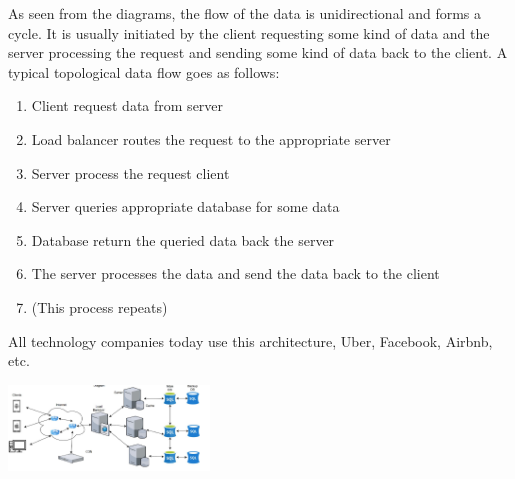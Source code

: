 As seen from the diagrams, the flow of the data is unidirectional and forms a
cycle. It is usually initiated by the client requesting some kind of data and
the server processing the request and sending some kind of data back to the
client. A typical topological data flow goes as follows:
\begin{enumerate}[noitemsep]
    \item Client request data from server
    \item Load balancer routes the request to the appropriate server
    \item Server process the request client
    \item Server queries appropriate database for some data
    \item Database return the queried data back the server
    \item The server processes the data and send the data back to the client
    \item (This process repeats)
\end{enumerate}

All technology companies today use this architecture, Uber, Facebook, Airbnb,
etc.
\begin{center}
    \includegraphics[width=0.4\textwidth]{./client-server}
\end{center}
